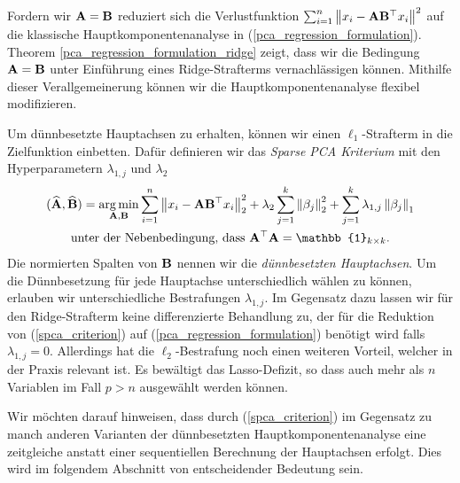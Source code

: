 Fordern wir $\mathbf{A} =  \mathbf{B}$ reduziert sich die Verlustfunktion $\sum_{i=1}^{n} \left\lVert x_i - \mathbf{A}\mathbf{B}^{\top}x_i \right\rVert^2$ auf die klassische Hauptkomponentenanalyse in (\ref{pca_regression_formulation}). Theorem \ref{pca_regression_formulation_ridge} zeigt, dass wir die Bedingung $\mathbf{A} = \mathbf{B}$ unter Einführung eines Ridge-Strafterms vernachlässigen können. Mithilfe dieser Verallgemeinerung können wir die Hauptkomponentenanalyse flexibel modifizieren.

Um dünnbesetzte Hauptachsen zu erhalten, können wir einen $\ell_1$-Strafterm in die Zielfunktion einbetten. Dafür definieren wir das \textit{Sparse PCA Kriterium} mit den Hyperparametern $\lambda_{1,j}$ und $\lambda_2$
\begin{align}
\label{spca_criterion}
\begin{gathered}
(\widehat{\mat{A}}, \widehat{\mat{B}}) = \argmin_{\mat{A}, \mat{B}} \sum_{i=1}^{n} \norm{x_i - \mat{A}\mat{B}^{\top}x_i}_2^2 + \lambda_2 \sum_{j=1}^{k}\norm{\beta_j}_2^2 + \sum_{j=1}^k \lambda_{1,j} \norm{\beta_j}_1\\
\text{unter der Nebenbedingung, dass } \mat{A}^{\top}\mat{A} = \mat{\mathbb{1}}_{k \times k}.
\end{gathered}
\end{align}
Die normierten Spalten von $\mathbf{B}$ nennen wir die \textit{dünnbesetzten Hauptachsen}. Um die Dünnbesetzung für jede Hauptachse unterschiedlich wählen zu können, erlauben wir unterschiedliche Bestrafungen $\lambda_{1,j}$. Im Gegensatz dazu lassen wir für den Ridge-Strafterm keine differenzierte Behandlung zu, der für die Reduktion von (\ref{spca_criterion}) auf (\ref{pca_regression_formulation}) benötigt wird falls $\lambda_{1,j} = 0$. Allerdings hat die $\ell_2$-Bestrafung noch einen weiteren Vorteil, welcher in der Praxis relevant ist. Es bewältigt das Lasso-Defizit, so dass auch mehr als $n$ Variablen im Fall $p>n$ ausgewählt werden können.

Wir möchten darauf hinweisen, dass durch (\ref{spca_criterion}) im Gegensatz zu manch anderen Varianten der dünnbesetzten Hauptkomponentenanalyse eine zeitgleiche anstatt einer sequentiellen Berechnung der Hauptachsen erfolgt. Dies wird im folgendem Abschnitt von entscheidender Bedeutung sein.




